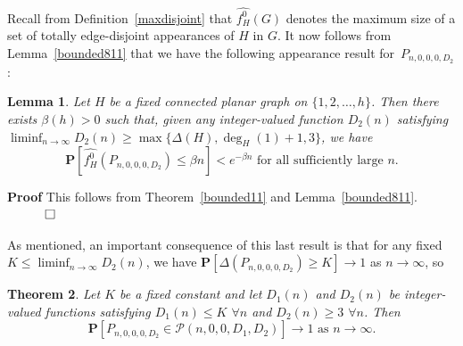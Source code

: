 \documentclass{article}
\newtheorem{Theorem}{Theorem}
\newtheorem{Lemma}[Theorem]{Lemma}
\newtheorem{Proof of Theorem}{Proof of Theorem}
\begin{document}
Recall from Definition~\ref{maxdisjoint} that
$\widehat{f_{H}^{0}}(G)$ denotes the maximum size of a set of totally edge-disjoint appearances of $H$ in $G$.
It now follows from Lemma~\ref{bounded811} that we have the following appearance result for~$P_{n,0,0,0,D_{2}}$:















\begin{Lemma} \label{bounded812}
Let $H$ be a fixed connected planar graph on $\{ 1,2, \ldots, h \}$.
Then there exists $\beta(h)>0$ such that,
given any integer-valued function $D_{2}(n)$ satisfying
$\liminf_{n \to \infty} D_{2}(n) \geq \max \{ \Delta(H), \deg_{H}(1)+1, 3 \}$,
we have
\begin{displaymath}
\mathbf{P}[\widehat{f_{H}^{0}} (P_{n,0,0,0,D_{2}}) \leq \beta n] < e^{- \beta n} 
\textrm{ for all sufficiently large } n.
\end{displaymath}
\end{Lemma}
\textbf{Proof}
This follows from Theorem~\ref{bounded11} and Lemma~\ref{bounded811}.
$\phantom{qwerty}
\setlength{\unitlength}{.25cm}
\begin{picture}(1,1)
\put(0,0){\line(1,0){1}}
\put(0,0){\line(0,1){1}}
\put(1,1){\line(-1,0){1}}
\put(1,1){\line(0,-1){1}}
\end{picture}$ 

\phantom{p}














As mentioned, an important consequence of this last result 
is that for any fixed $K \leq \liminf_{n \to \infty} D_{2}(n)$,
we have $\mathbf{P}[\Delta(P_{n,0,0,0,D_{2}}) \geq K] \to 1$ as $n \to \infty$,
so 















\begin{Theorem} \label{bounded147}
Let $K$ be a fixed constant and let $D_{1}(n)$ and $D_{2}(n)$ be integer-valued functions satisfying
$D_{1}(n) \leq K$ $\forall n$ and $D_{2}(n) \geq 3$ $\forall n$.
Then
\begin{displaymath}
\mathbf{P}[P_{n,0,0,0,D_{2}} \in \mathcal{P}(n,0,0,D_{1},D_{2})] \to 1 \textrm{ as } n \to \infty.
\end{displaymath} 
\end{Theorem}
\end{document}
